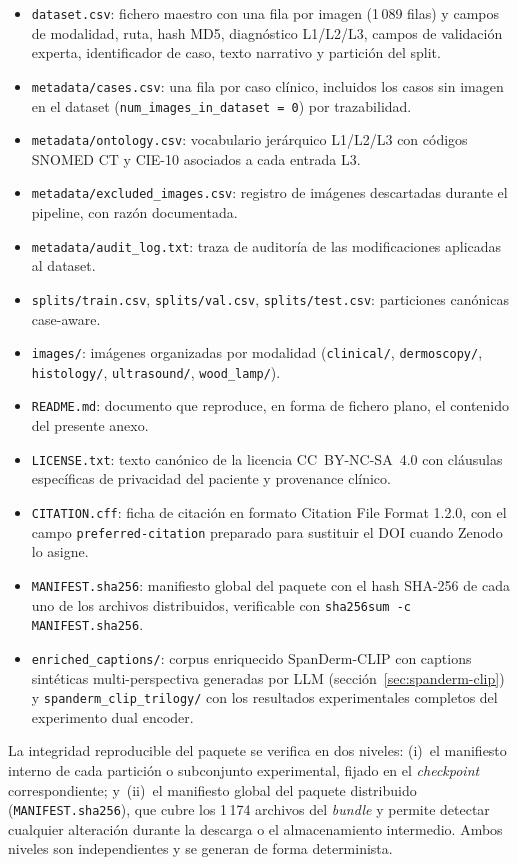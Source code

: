 \begin{itemize}
\item \texttt{dataset.csv}: fichero maestro con una fila por imagen
(1\,089 filas) y campos de modalidad, ruta, hash MD5, diagnóstico
L1/L2/L3, campos de validación experta, identificador de caso,
texto narrativo y partición del split.
\item \texttt{metadata/cases.csv}: una fila por caso clínico,
incluidos los casos sin imagen en el dataset
(\texttt{num\_images\_in\_dataset = 0}) por trazabilidad.
\item \texttt{metadata/ontology.csv}: vocabulario jerárquico
L1/L2/L3 con códigos SNOMED CT y CIE-10 asociados a cada entrada
L3.
\item \texttt{metadata/excluded\_images.csv}: registro de imágenes
descartadas durante el pipeline, con razón documentada.
\item \texttt{metadata/audit\_log.txt}: traza de auditoría de las
modificaciones aplicadas al dataset.
\item \texttt{splits/train.csv}, \texttt{splits/val.csv},
\texttt{splits/test.csv}: particiones canónicas case-aware.
\item \texttt{images/}: imágenes organizadas por modalidad
(\texttt{clinical/}, \texttt{dermoscopy/}, \texttt{histology/},
\texttt{ultrasound/}, \texttt{wood\_lamp/}).
\item \texttt{README.md}: documento que reproduce, en forma de
fichero plano, el contenido del presente anexo.
\item \texttt{LICENSE.txt}: texto canónico de la licencia
CC~BY-NC-SA~4.0 con cláusulas específicas de privacidad del
paciente y provenance clínico.
\item \texttt{CITATION.cff}: ficha de citación en formato Citation
File Format 1.2.0, con el campo \texttt{preferred-citation}
preparado para sustituir el DOI cuando Zenodo lo asigne.
\item \texttt{MANIFEST.sha256}: manifiesto global del paquete con
el hash SHA-256 de cada uno de los archivos distribuidos,
verificable con \texttt{sha256sum -c MANIFEST.sha256}.
\item \texttt{enriched\_captions/}: corpus enriquecido SpanDerm-CLIP
con captions sintéticas multi-perspectiva generadas por LLM
(sección~\ref{sec:spanderm-clip}) y \texttt{spanderm\_clip\_trilogy/}
con los resultados experimentales completos del experimento dual
encoder.
\end{itemize}

La integridad reproducible del paquete se verifica en dos niveles:
(i)~el manifiesto interno de cada partición o subconjunto
experimental, fijado en el \emph{checkpoint} correspondiente;
y~(ii)~el manifiesto global del paquete distribuido
(\texttt{MANIFEST.sha256}), que cubre los 1\,174 archivos del
\emph{bundle} y permite detectar cualquier alteración durante la
descarga o el almacenamiento intermedio. Ambos niveles son
independientes y se generan de forma determinista.

